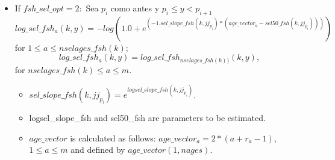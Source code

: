 \documentclass{article}
\begin{document}
\begin{itemize}
    
\item If $fsh\_sel\_opt=2:$ 
Sea $p_i$ como antes y  $p_i\leq y < p_{i+1}$
\begin{equation}
            log\_sel\_fsh_a(k,y)=-log( 1.0 + e^{(-1.sel\_slope\_fsh(k,jj_{p_i}) * ( age\_vector_a - sel50\_fsh(k,jj_{p_i})) )})
        \end{equation}
        for $1\leq a \leq nselages\_fsh(k)$;
        \begin{equation}
            log\_sel\_fsh_a(k,y)=log\_sel\_fsh_{nselages\_fsh(k))}(k,y),
        \end{equation}
        for $nselages\_fsh(k) \leq a \leq m$.
        \begin{itemize}
            \item $sel\_slope\_fsh(k,jj_{p_i}) = e^{logsel\_slope\_fsh(k,jj_{p_i})}$.
            \item logsel\_slope\_fsh and sel50\_fsh are parameters to be estimated.
            \item $age\_vector$ is calculated as follows: $age\_vector_a=2*(a+r_a-1)$, $1\leq a \leq m$  and defined by $age\_vector(1,nages)$.
        \end{itemize}



\end{itemize}
\end{document}
